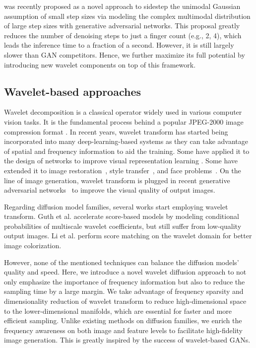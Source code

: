 \documentclass[10pt,twocolumn,letterpaper]{article}
\newcommand{\minisection}[1]{\vspace{2mm}\noindent{\textbf{#1}}}
\begin{document}
\minisection{Diffusion GAN \cite{xiao2021tackling}} was recently proposed as a novel approach to sidestep the unimodal Gaussian assumption of small step sizes via modeling the complex multimodal distribution of large step sizes with generative adversarial networks. This proposal greatly reduces the number of denoising steps to just a finger count (e.g., 2, 4), which leads the inference time to a fraction of a second. However, it is still largely slower than GAN competitors. Hence, we further maximize its full potential by introducing new wavelet components on top of this framework.
\subsection{Wavelet-based approaches} Wavelet decomposition \cite{mallat1989theory,chui1992introduction} is a classical operator widely used in various computer vision tasks. It is the fundamental process behind a popular JPEG-2000 image compression format \cite{Taubman2012}. In recent years, wavelet transform has started being incorporated into many deep-learning-based systems as they can take advantage of spatial and frequency information to aid the training. Some have applied it to the design of networks to improve visual representation learning \cite{li2020wavelet,liu2019multi,yao2022wave,jiang2021focal}. Some have extended it to image restoration~\cite{yu2021wavefill, deng2019wavelet}, style transfer~\cite{yoo2019photorealistic}, and face problems~\cite{gao2021high,huang2019wavelet}. On the line of image generation, wavelet transform is plugged in recent generative adversarial networks~\cite{Yang2022WaveGAN, zhang2022styleswin, gal2021swagan,yang2022fregan} to improve the visual quality of output images. 

Regarding diffusion model families, several works start employing wavelet transform. Guth et al. \cite{guth2022wavelet} accelerate score-based models by modeling conditional probabilities of multiscale wavelet coefficients, but still suffer from low-quality output images. Li et al. \cite{li2022wavelet} perform score matching on the wavelet domain for better image colorization.


However, none of the mentioned techniques can balance the diffusion models' quality and speed. Here, we introduce a novel wavelet diffusion approach to not only emphasize the importance of frequency information but also to reduce the sampling time by a large margin. We take advantage of frequency sparsity and dimensionality reduction of wavelet transform to reduce high-dimensional space to the lower-dimensional manifolds, which are essential for faster and more efficient sampling. Unlike existing methods on diffusion families, we enrich the frequency awareness on both image and feature levels to facilitate high-fidelity image generation. This is greatly inspired by the success of wavelet-based GANs.
\end{document}
